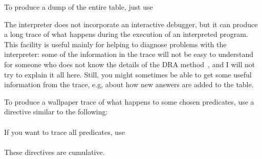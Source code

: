 To produce a dump of the entire table, just use\\
\ind{}




The interpreter does not incorporate an interactive debugger, but it can
produce a long trace of what happens during the execution of an interpreted
program.  This facility is useful mainly for helping to diagnose problems
with the interpreter: some of the information in the trace will not be easy
to understand for someone who does not know the details of the DRA
method~\cite{guo-gupta-dra}, and I will not try to explain it all here.
Still, you might sometimes be able to get some useful information from the
trace, e.g, about how new answers are added to the table.

To produce a wallpaper trace of what happens to some chosen predicates, use a
directive similar to the following:\\
\ind{}\label{dir:trace}\\
If you want to trace all predicates, use\\
\ind{}\\
These directives are cumulative.


